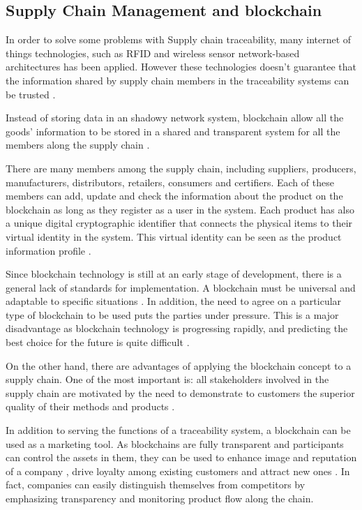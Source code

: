 \subsection{Supply Chain Management and blockchain}\label{sec:scm}

In order to solve some problems with Supply chain traceability, many internet of things technologies, such as RFID and wireless sensor network-based architectures has been applied. However these technologies doesn't guarantee that the information shared by supply chain members in the traceability systems can be trusted \cite{tian2017supply}.

Instead of storing data in an shadowy network system, blockchain allow all the goods' information to be stored in a shared and transparent system for all the members along the supply chain \cite{tian2017supply}.

There are many members among the supply chain, including suppliers, producers, manufacturers, distributors, retailers, consumers and certifiers. Each of these members can add, update and check the information about the product on the blockchain as long as they register as a user in the system. Each product has also a unique digital cryptographic identifier that connects the physical items to their virtual identity in the system. This virtual identity can be seen as the product information profile \cite{tian2017supply}.

Since blockchain technology is still at an early stage of development, there is a general lack of standards for implementation. A blockchain must be universal and adaptable to specific situations \cite{valenta2017comparison}. In addition, the need to agree on a particular type of blockchain to be used puts the parties under pressure. This is a major disadvantage as blockchain technology is progressing rapidly, and predicting the best choice for the future is quite difficult \cite{galvez2018future}.

On the other hand, there are advantages of applying the blockchain concept to a supply chain. One of the most important is: all stakeholders involved in the supply chain are motivated by the need to demonstrate to customers the superior quality of their methods and products \cite{lu2017adaptable}. 

In addition to serving the functions of a traceability system, a blockchain can be used as a marketing tool. As blockchains are fully transparent and participants can control the assets in them, they can be used to enhance image and reputation of a company \cite{van2007essentials}, drive loyalty among existing customers \cite{pizzuti2015global} and attract new ones \cite{svensson2009transparency}. In fact, companies can easily distinguish themselves from competitors by emphasizing transparency and monitoring product flow along the chain.